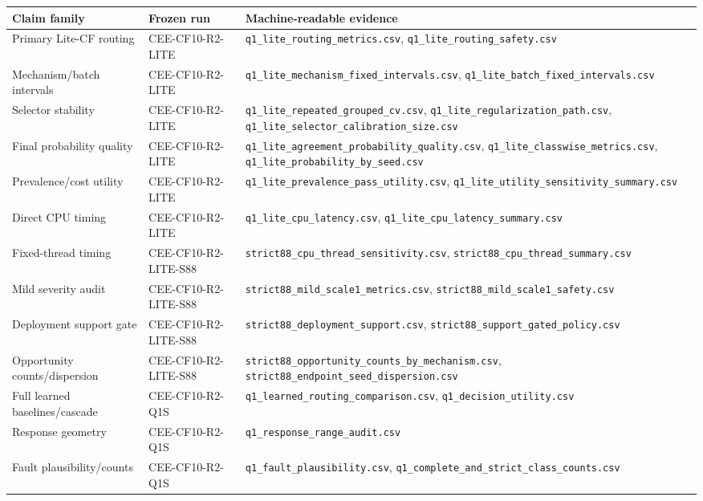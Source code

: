 \begin{tabular}{p{}p{}p{}}
\toprule
Claim family & Frozen run & Machine-readable evidence \\
\midrule
Primary Lite-CF routing & CEE-CF10-R2-LITE & \texttt{q1\_lite\_routing\_metrics.csv}, \texttt{q1\_lite\_routing\_safety.csv} \\
Mechanism/batch intervals & CEE-CF10-R2-LITE & \texttt{q1\_lite\_mechanism\_fixed\_intervals.csv}, \texttt{q1\_lite\_batch\_fixed\_intervals.csv} \\
Selector stability & CEE-CF10-R2-LITE & \texttt{q1\_lite\_repeated\_grouped\_cv.csv}, \texttt{q1\_lite\_regularization\_path.csv}, \texttt{q1\_lite\_selector\_calibration\_size.csv} \\
Final probability quality & CEE-CF10-R2-LITE & \texttt{q1\_lite\_agreement\_probability\_quality.csv}, \texttt{q1\_lite\_classwise\_metrics.csv}, \texttt{q1\_lite\_probability\_by\_seed.csv} \\
Prevalence/cost utility & CEE-CF10-R2-LITE & \texttt{q1\_lite\_prevalence\_pass\_utility.csv}, \texttt{q1\_lite\_utility\_sensitivity\_summary.csv} \\
Direct CPU timing & CEE-CF10-R2-LITE & \texttt{q1\_lite\_cpu\_latency.csv}, \texttt{q1\_lite\_cpu\_latency\_summary.csv} \\
Fixed-thread timing & CEE-CF10-R2-LITE-S88 & \texttt{strict88\_cpu\_thread\_sensitivity.csv}, \texttt{strict88\_cpu\_thread\_summary.csv} \\
Mild severity audit & CEE-CF10-R2-LITE-S88 & \texttt{strict88\_mild\_scale1\_metrics.csv}, \texttt{strict88\_mild\_scale1\_safety.csv} \\
Deployment support gate & CEE-CF10-R2-LITE-S88 & \texttt{strict88\_deployment\_support.csv}, \texttt{strict88\_support\_gated\_policy.csv} \\
Opportunity counts/dispersion & CEE-CF10-R2-LITE-S88 & \texttt{strict88\_opportunity\_counts\_by\_mechanism.csv}, \texttt{strict88\_endpoint\_seed\_dispersion.csv} \\
Full learned baselines/cascade & CEE-CF10-R2-Q1S & \texttt{q1\_learned\_routing\_comparison.csv}, \texttt{q1\_decision\_utility.csv} \\
Response geometry & CEE-CF10-R2-Q1S & \texttt{q1\_response\_range\_audit.csv} \\
Fault plausibility/counts & CEE-CF10-R2-Q1S & \texttt{q1\_fault\_plausibility.csv}, \texttt{q1\_complete\_and\_strict\_class\_counts.csv} \\
\bottomrule
\end{tabular}
